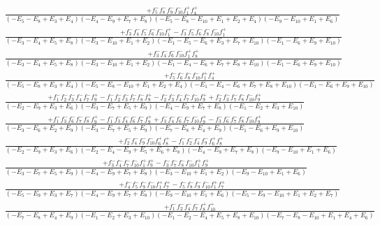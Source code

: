 \documentclass{article}
\begin{document}
\[\begin{array}{rcl}
\frac{+f_{5}^{-}f_{8}^{-}f_{9}^{-}f_{10}^{-}f_{1}^{+}f_{4}^{+}}{(-E_{5}-E_{8}+E_{3}+E_{4})(-E_{4}-E_{9}+E_{7}+E_{8})(-E_{5}-E_{8}-E_{10}+E_{1}+E_{2}+E_{4})(-E_{9}-E_{10}+E_{1}+E_{6})}\\
\frac{+f_{3}^{-}f_{4}^{-}f_{5}^{-}f_{6}^{-}f_{10}^{-}f_{1}^{+}-f_{3}^{-}f_{5}^{-}f_{6}^{-}f_{8}^{-}f_{10}^{-}f_{1}^{+}}{(-E_{3}-E_{4}+E_{5}+E_{8})(-E_{3}-E_{10}+E_{1}+E_{2})(-E_{1}-E_{5}-E_{6}+E_{3}+E_{7}+E_{10})(-E_{1}-E_{6}+E_{9}+E_{10})}\\
\frac{+f_{3}^{-}f_{4}^{-}f_{6}^{-}f_{10}^{-}f_{1}^{+}f_{8}^{+}}{(-E_{3}-E_{4}+E_{5}+E_{8})(-E_{3}-E_{10}+E_{1}+E_{2})(-E_{1}-E_{4}-E_{6}+E_{7}+E_{8}+E_{10})(-E_{1}-E_{6}+E_{9}+E_{10})}\\
\frac{+f_{5}^{-}f_{6}^{-}f_{8}^{-}f_{10}^{-}f_{1}^{+}f_{4}^{+}}{(-E_{5}-E_{8}+E_{3}+E_{4})(-E_{5}-E_{8}-E_{10}+E_{1}+E_{2}+E_{4})(-E_{1}-E_{4}-E_{6}+E_{7}+E_{8}+E_{10})(-E_{1}-E_{6}+E_{9}+E_{10})}\\
\frac{+f_{1}^{-}f_{2}^{-}f_{3}^{-}f_{4}^{-}f_{7}^{-}f_{9}^{+}-f_{1}^{-}f_{2}^{-}f_{3}^{-}f_{7}^{-}f_{8}^{-}f_{9}^{+}-f_{2}^{-}f_{3}^{-}f_{4}^{-}f_{7}^{-}f_{10}^{-}f_{9}^{+}+f_{2}^{-}f_{3}^{-}f_{7}^{-}f_{8}^{-}f_{10}^{-}f_{9}^{+}}{(-E_{2}-E_{9}+E_{3}+E_{6})(-E_{3}-E_{7}+E_{5}+E_{9})(-E_{4}-E_{9}+E_{7}+E_{8})(-E_{1}-E_{2}+E_{3}+E_{10})}\\
\frac{+f_{1}^{-}f_{3}^{-}f_{6}^{-}f_{7}^{-}f_{8}^{-}f_{9}^{+}-f_{1}^{-}f_{3}^{-}f_{4}^{-}f_{6}^{-}f_{7}^{-}f_{9}^{+}+f_{3}^{-}f_{4}^{-}f_{6}^{-}f_{7}^{-}f_{10}^{-}f_{9}^{+}-f_{3}^{-}f_{6}^{-}f_{7}^{-}f_{8}^{-}f_{10}^{-}f_{9}^{+}}{(-E_{3}-E_{6}+E_{2}+E_{9})(-E_{3}-E_{7}+E_{5}+E_{9})(-E_{7}-E_{8}+E_{4}+E_{9})(-E_{1}-E_{6}+E_{9}+E_{10})}\\
\frac{+f_{2}^{-}f_{4}^{-}f_{9}^{-}f_{10}^{-}f_{6}^{+}f_{8}^{+}-f_{1}^{-}f_{2}^{-}f_{4}^{-}f_{9}^{-}f_{6}^{+}f_{8}^{+}}{(-E_{2}-E_{9}+E_{3}+E_{6})(-E_{2}-E_{4}-E_{9}+E_{5}+E_{6}+E_{8})(-E_{4}-E_{9}+E_{7}+E_{8})(-E_{9}-E_{10}+E_{1}+E_{6})}\\
\frac{+f_{3}^{-}f_{4}^{-}f_{7}^{-}f_{10}^{-}f_{1}^{+}f_{9}^{+}-f_{3}^{-}f_{7}^{-}f_{8}^{-}f_{10}^{-}f_{1}^{+}f_{9}^{+}}{(-E_{3}-E_{7}+E_{5}+E_{9})(-E_{4}-E_{9}+E_{7}+E_{8})(-E_{3}-E_{10}+E_{1}+E_{2})(-E_{9}-E_{10}+E_{1}+E_{6})}\\
\frac{+f_{4}^{-}f_{5}^{-}f_{9}^{-}f_{10}^{-}f_{1}^{+}f_{7}^{+}-f_{5}^{-}f_{8}^{-}f_{9}^{-}f_{10}^{-}f_{1}^{+}f_{7}^{+}}{(-E_{5}-E_{9}+E_{3}+E_{7})(-E_{4}-E_{9}+E_{7}+E_{8})(-E_{9}-E_{10}+E_{1}+E_{6})(-E_{5}-E_{9}-E_{10}+E_{1}+E_{2}+E_{7})}\\
\frac{+f_{1}^{-}f_{2}^{-}f_{4}^{-}f_{7}^{-}f_{8}^{+}f_{10}^{+}}{(-E_{7}-E_{8}+E_{4}+E_{9})(-E_{1}-E_{2}+E_{3}+E_{10})(-E_{1}-E_{2}-E_{4}+E_{5}+E_{8}+E_{10})(-E_{7}-E_{8}-E_{10}+E_{1}+E_{4}+E_{6})}\\

\end{array}\]
\end{document}
